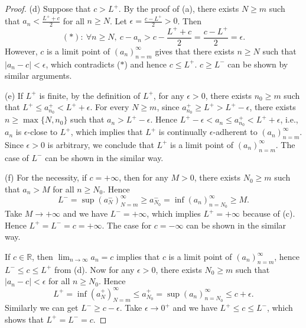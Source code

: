 \begin{proof}
  (d) Suppose that $c>L^{+}$. By the proof of (a),
  there exists $N\ge m$ such that $a_{n}<\frac{L^{+}+c}{2}$
  for all $n\ge N$. Let $\epsilon=\frac{c-L^{+}}{2}>0$.
  Then
  \begin{displaymath}
    (\ast):\ \forall n\ge N,\ 
    c-a_{n}>c-\frac{L^{+}+c}{2}=\frac{c-L^{+}}{2}=\epsilon.
  \end{displaymath}
  However, $c$ is a limit point of $(a_{n})_{n=m}^{\infty}$ gives that
  there exists $n\ge N$ such that $|a_{n}-c|<\epsilon$,
  which contradicts ($\ast$) and hence $c\le L^{+}$.
  $c\ge L^{-}$ can be shown by similar arguments.

  (e) If $L^{+}$ is finite, by the definition of $L^{+}$,
  for any $\epsilon>0$, there exists $n_{0}\ge m$ such that
  $L^{+} \le a_{n_{0}}^{+}<L^{+}+\epsilon$.
  For every $N\ge m$, 
  since $a_{n_{0}}^{+}\ge L^{+}>L^{+}-\epsilon$,
  there exists $n\ge \max\{N,n_{0}\}$ such that $a_{n}>L^{+}-\epsilon.$
  Hence $L^{+}-\epsilon<a_{n}\le a_{n_{0}}^{+}<L^{+}+\epsilon$, i.e.,
  $a_{n}$ is $\epsilon$-close to $L^{+}$, which implies that
  $L^{+}$ is continually $\epsilon$-adherent to
  $(a_{n})_{n=m}^{\infty}$.
  Since $\epsilon>0$ is arbitrary, we conclude that 
  $L^{+}$ is a limit point of $(a_{n})_{n=m}^{\infty}$.
  The case of $L^{-}$ can be shown in the similar way.

  (f) For the necessity,
  if $c=+\infty$, then for any $M>0$,
  there exists $N_{0}\ge m$ such that
  $a_{n}>M$ for all $n\ge N_{0}$. Hence
  \begin{displaymath}
    L^{-}=\sup(a_{N}^{-})_{N=m}^{\infty}
    \ge a_{N_{0}}^{-}
    =\inf(a_{n})_{n=N_{0}}^{\infty}
    \ge M.
  \end{displaymath}
  Take $M\rightarrow +\infty$ and we have $L^{-}=+\infty$,
  which implies $L^{+}=+\infty$ because of (c).
  Hence $L^{+}=L^{-}=c=+\infty.$
  The case for $c=-\infty$ can be shown in the similar way.

  If $c\in \mathbb{R}$, then
  $\lim_{n\rightarrow \infty}a_{n}=c$ implies that
  $c$ is a limit point of $(a_{n})_{n=m}^{\infty}$, hence
  $L^{-}\le c\le L^{+}$ from (d).
  Now for any $\epsilon>0$, there exists $N_{0}\ge m$ such that
  $|a_{n}-c|<\epsilon$ for all $n\ge N_{0}$. Hence
  \begin{displaymath}
    L^{+}=\inf(a_{N}^{+})_{N=m}^{\infty}
    \le a_{N_{0}}^{+}
    =\sup(a_{n})_{n=N_{0}}^{\infty}\le c+\epsilon.
  \end{displaymath}
  Similarly we can get $L^{-}\ge c-\epsilon$.
  Take $\epsilon\rightarrow 0^{+}$ and we have $L^{+}\le c\le L^{-}$,
  which shows that $L^{+}=L^{-}=c$.


\end{proof}
